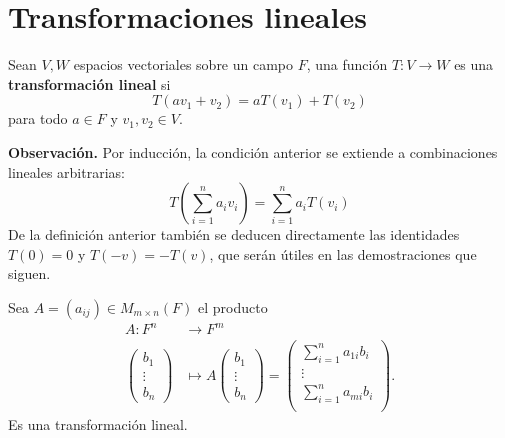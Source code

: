 \documentclass[12pt,a4paper]{book}
\newcommand{\parentesis}[1]{\left(#1\right)}
\begin{document}
    \section{Transformaciones lineales}


    \begin{definicion}
        Sean $V,W$ espacios vectoriales sobre un campo $F$, una función $T:V\to W$ es una
        \textbf{transformación lineal} si
        \begin{equation*}
            T(av_{1}+v_{2})=aT(v_{1})+T(v_{2})
        \end{equation*}
        para todo $a\in F$ y $v_{1},v_{2}\in V$.
    \end{definicion}

    \textbf{Observación.}
    Por inducción, la condición anterior se extiende a combinaciones lineales arbitrarias:
    \begin{equation*}
        T\parentesis{\sum_{i = 1}^na_iv_i} = \sum_{i = 1}^na_iT(v_i)
    \end{equation*}
    De la definición anterior también se deducen directamente las identidades $T(0)=0$ y $T(-v)=-T(v)$, que serán útiles en las demostraciones que siguen.

    \begin{ejemplo}
        Sea $A = (a_{ij}) \in M_{m \times n}(F)$ el producto
        \begin{align*}
            A:F^n & \to F^m\\
            \begin{pmatrix}
                b_1\\
                \vdots\\
                b_n
            \end{pmatrix}
            & \mapsto A\begin{pmatrix}
                b_1\\
                \vdots\\
                b_n
            \end{pmatrix} = 
            \begin{pmatrix}
                \sum_{i = 1}^na_{1i}b_i\\
                \vdots\\
                \sum_{i = 1}^na_{mi}b_i\\
            \end{pmatrix}.
        \end{align*}
        Es una transformación lineal.
    \end{ejemplo}
\end{document}
